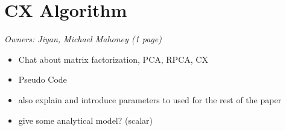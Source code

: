 \section{CX Algorithm}
\textit{Owners: Jiyan, Michael Mahoney (1 page)}
\begin{itemize}

  \item Chat about matrix factorization, PCA, RPCA, CX 

  \item Pseudo Code

  \item also explain and introduce parameters to used for the rest of the paper

  \item give some analytical model? (scalar)

\end{itemize}

